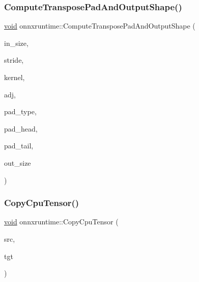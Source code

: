 \mbox{\label{namespaceonnxruntime_a1546c72a9158f8f9255e27f888dfff9c}} 
\subsubsection{\texorpdfstring{Compute\+Transpose\+Pad\+And\+Output\+Shape()}{ComputeTransposePadAndOutputShape()}}
{\footnotesize\ttfamily \mbox{\hyperlink{mlasi_8h_a88f941d423cb2a819b70a1358982b1a6}{void}} onnxruntime\+::\+Compute\+Transpose\+Pad\+And\+Output\+Shape (\begin{DoxyParamCaption}\item[{const int64\+\_\+t}]{in\+\_\+size,  }\item[{const int64\+\_\+t}]{stride,  }\item[{const int64\+\_\+t}]{kernel,  }\item[{const int64\+\_\+t}]{adj,  }\item[{\mbox{\hyperlink{namespaceonnxruntime_add1059a27d156d4ed3567a3a6852d94f}{Auto\+Pad\+Type}}}]{pad\+\_\+type,  }\item[{int64\+\_\+t $\ast$}]{pad\+\_\+head,  }\item[{int64\+\_\+t $\ast$}]{pad\+\_\+tail,  }\item[{int64\+\_\+t $\ast$}]{out\+\_\+size }\end{DoxyParamCaption})\hspace{0.3cm}{\ttfamily [inline]}}

\mbox{\label{namespaceonnxruntime_ae7108694b1ea94ae83a8b8a6dc34a817}} 
\subsubsection{\texorpdfstring{Copy\+Cpu\+Tensor()}{CopyCpuTensor()}}
{\footnotesize\ttfamily \mbox{\hyperlink{mlasi_8h_a88f941d423cb2a819b70a1358982b1a6}{void}} onnxruntime\+::\+Copy\+Cpu\+Tensor (\begin{DoxyParamCaption}\item[{const \mbox{\hyperlink{classonnxruntime_1_1Tensor}{Tensor}} $\ast$}]{src,  }\item[{\mbox{\hyperlink{classonnxruntime_1_1Tensor}{Tensor}} $\ast$}]{tgt }\end{DoxyParamCaption})\hspace{0.3cm}{\ttfamily [inline]}}

